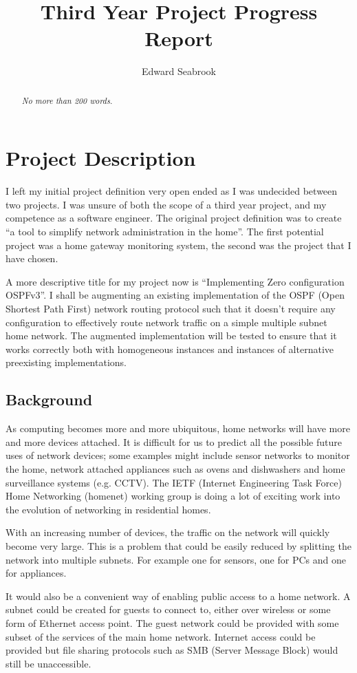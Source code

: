 \documentclass[12pt]{report}
\author{Edward Seabrook}
\title{Third Year Project Progress Report}
\begin{document}



\begin{abstract}
\em No more than 200 words. \em


\end{abstract}

\tableofcontents
\clearpage

\chapter{Project Description}
I left my initial project definition very open ended as I was undecided between
two projects. I was unsure of both the scope of a third year project, and my
competence as a software engineer. The original project definition was to create
``a tool to simplify network administration in the home''. The first potential
project was a home gateway monitoring system, the second was the project that
I have chosen. 

A more descriptive title for my project now is ``Implementing Zero configuration
OSPFv3''. I shall be augmenting an existing implementation of the OSPF (Open
Shortest Path First) network routing protocol such that it doesn't require any
configuration to effectively route network traffic on a simple multiple subnet
home network. The augmented implementation will be tested to ensure that it
works correctly both with homogeneous instances and instances of alternative
preexisting implementations. 

\section{Background}
As computing becomes more and more ubiquitous, home networks will have more and
more devices attached. It is difficult for us to predict all the possible future
uses of network devices; some examples might include sensor networks to monitor
the home, network attached appliances such as ovens and dishwashers and home
surveillance systems (e.g. CCTV). The IETF (Internet Engineering Task Force)
Home Networking (homenet) working group is doing a lot of exciting work into the
evolution of networking in residential homes. 

With an increasing number of devices, the traffic on the network will quickly
become very large. This is a problem that could be easily reduced by splitting
the network into multiple subnets. For example one for sensors, one for PCs and
one for appliances. 

It would also be a convenient way of enabling public access to a home network. A
subnet could be created for guests to connect to, either over wireless or some
form of Ethernet access point. The guest network could be provided with some
subset of the services of the main home network. Internet access could be
provided but file sharing protocols such as SMB (Server Message Block) would
still be unaccessible.
\end{document}
